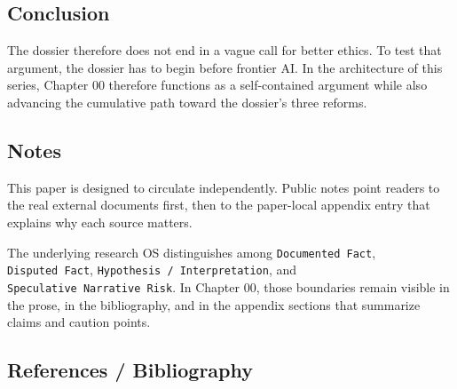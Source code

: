 \documentclass[
  american,
  11pt,
  letterpaper,
]{article}
\begin{document}
\subsection{Conclusion}\label{conclusion}

The dossier therefore does not end in a vague call for better ethics. To
test that argument, the dossier has to begin before frontier AI. In the
architecture of this series, Chapter 00 therefore functions as a
self-contained argument while also advancing the cumulative path toward
the dossier's three reforms.

\subsection{Notes}\label{notes}

This paper is designed to circulate independently. Public notes point
readers to the real external documents first, then to the paper-local
appendix entry that explains why each source matters.

The underlying research OS distinguishes among
\texttt{Documented\ Fact}, \texttt{Disputed\ Fact},
\texttt{Hypothesis\ /\ Interpretation}, and
\texttt{Speculative\ Narrative\ Risk}. In Chapter 00, those boundaries
remain visible in the prose, in the bibliography, and in the appendix
sections that summarize claims and caution points.

\subsection{References / Bibliography}\label{references-bibliography}
\end{document}
